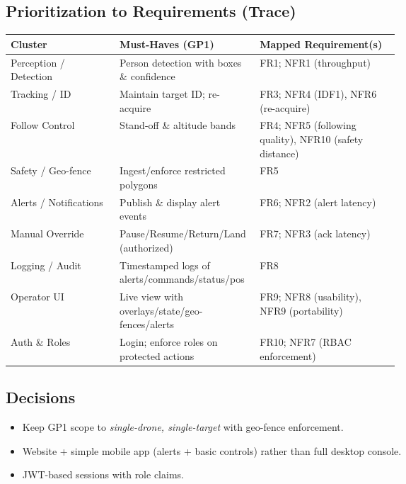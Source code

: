 \documentclass[12pt,a4paper]{report}
\begin{document}
\subsection*{Prioritization to Requirements (Trace)}
\begin{tabularx}{\linewidth}{|>{\raggedright\arraybackslash}p{0.28\linewidth}|>{\raggedright\arraybackslash}p{0.36\linewidth}|>{\raggedright\arraybackslash}X|}
\hline
\textbf{Cluster} & \textbf{Must-Haves (GP1)} & \textbf{Mapped Requirement(s)} \\
\hline
Perception / Detection & Person detection with boxes \& confidence & FR1; NFR1 (throughput) \\
\hline
Tracking / \ac{ID} & Maintain target \ac{ID}; re-acquire & FR3; NFR4 (IDF1), NFR6 (re-acquire) \\
\hline
Follow Control & Stand-off \& altitude bands & FR4; NFR5 (following quality), NFR10 (safety distance) \\
\hline
Safety / Geo-fence & Ingest/enforce restricted polygons & FR5 \\
\hline
Alerts / Notifications & Publish \& display alert events & FR6; NFR2 (alert latency) \\
\hline
Manual Override & Pause/Resume/Return/Land (authorized) & FR7; NFR3 (ack latency) \\
\hline
Logging / Audit & Timestamped logs of alerts/commands/status/pos & FR8 \\
\hline
Operator UI & Live view with overlays/state/geo-fences/alerts & FR9; NFR8 (usability), NFR9 (portability) \\
\hline
Auth \& Roles & Login; enforce roles on protected actions & FR10; NFR7 (\ac{RBAC} enforcement) \\
\hline
\end{tabularx}

\subsection*{Decisions}
\begin{itemize}[leftmargin=*]
\item Keep GP1 scope to \textit{single-drone, single-target} with geo-fence enforcement.
\item Website + simple mobile app (alerts + basic controls) rather than full desktop console.
\item \ac{JWT}-based sessions with role claims.
\end{itemize}
\end{document}
